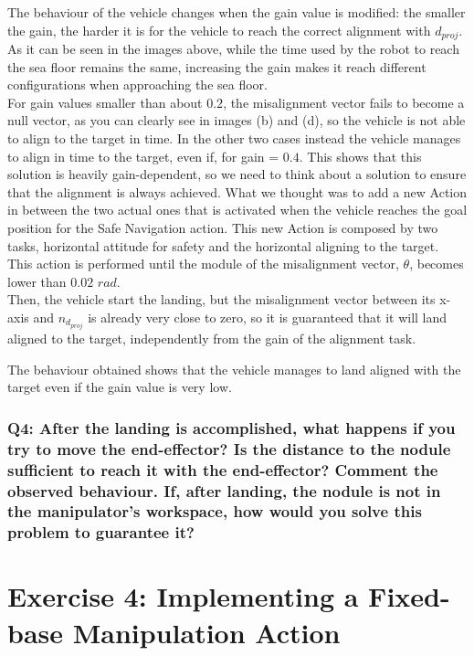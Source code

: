 \documentclass{article}
\begin{document}
The behaviour of the vehicle changes when the gain value is modified: the smaller the gain, the harder it is for the vehicle to reach the correct alignment with \(d_{proj}\). As it can be seen in the images above, while the time used by the robot to reach the sea floor remains the same, increasing the gain makes it reach different configurations when approaching the sea floor.\\
For gain values smaller than about \(0.2\), the misalignment vector fails to become a null vector, as you can clearly see in images (b) and (d), so the vehicle is not able to align to the target in time. In the other two cases instead the vehicle manages to align in time to the target, even if, for gain = \(0.4\).
This shows that this solution is heavily gain-dependent, so we need to think about a solution to ensure that the alignment is always achieved.
What we thought was to add a new Action in between the two actual ones that is activated when the vehicle reaches the goal position for the Safe Navigation action. This new Action is composed by two tasks, horizontal attitude for safety and the horizontal aligning to the target. This action is performed until the module of the misalignment vector, $\theta$, becomes lower than \(0.02 \) \({rad}\).\\
Then, the vehicle start the landing, but the misalignment vector between its x-axis and \(n_{d_{proj}}\) is already very close to zero, so it is guaranteed that it will land aligned to the target, independently from the gain of the alignment task.
\begin{figure}[H]
	\centering
	\label{im:v_land_gain0_1_ind}
\end{figure} 
The behaviour obtained shows that the vehicle manages to land aligned with the target even if the gain value is very low.
 
\subsubsection{Q4: After the landing is accomplished, what happens if you try to move the end-effector? Is the distance to the nodule sufficient to reach it with the end-effector? Comment the observed behaviour. If, after landing, the nodule is not in the manipulator's workspace, how would you solve this problem to guarantee it?}


\clearpage
\section{Exercise 4: Implementing a Fixed-base Manipulation Action}
\end{document}
